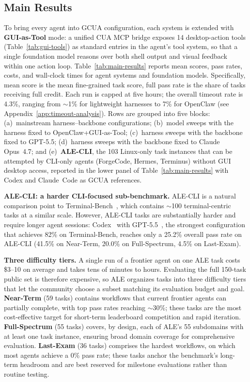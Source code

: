 \documentclass{llmxive}
\providecommand{\taskcount}{55}
\providecommand{\neartermcount}{59}
\providecommand{\fullspectrumcount}{55}
\providecommand{\lastexamcount}{36}
\providecommand{\publictaskcount}{150}
\providecommand{\aleclicount}{103}
\begin{document}
\subsection{Main Results}
To bring every agent into GCUA configuration, each system is extended with \textbf{GUI-as-Tool} mode: a unified CUA MCP bridge exposes 14 desktop-action tools (Table~\ref{tab:gui-tools}) as standard entries in the agent's tool system, so that a single foundation model reasons over both shell output and visual feedback within one action loop.
Table~\ref{tab:main-results} reports mean scores, pass rates, costs, and wall-clock times for agent systems and foundation models. Specifically, mean score is the mean fine-grained task score, full pass rate is the share of tasks receiving full credit. Each run is capped at five hours; the overall timeout rate is 4.3\%, ranging from ${\sim}$1\% for lightweight harnesses to 7\% for OpenClaw (see Appendix~\ref{app:timeout-analysis}).
Rows are grouped into five blocks: (a)~mainstream harness--backbone configurations; (b)~model sweeps with the harness fixed to OpenClaw+GUI-as-Tool; (c)~harness sweeps with the backbone fixed to GPT-5.5; (d)~harness sweeps with the backbone fixed to Claude Opus~4.7; and (e)~\textbf{ALE-CLI}, the \aleclicount{} Linux-only task instances that can be attempted by CLI-only agents (ForgeCode, Hermes, Terminus) without GUI desktop access, reported in the lower panel of Table~\ref{tab:main-results} with Codex and Claude~Code as GCUA references.

\noindent \textbf{ALE-CLI: a harder CLI-focused sub-benchmark.}
ALE-CLI is a natural comparison point to Terminal-Bench~\citep{merrill2026terminalbench}, which contains ${\sim}$100 terminal-centric tasks at a similar scale.
However, ALE-CLI tasks are substantially harder and require longer agent sessions:
Codex~\citep{openai2025codex} with GPT-5.5~\citep{openai2026gpt55}, the strongest configuration that achieves 82\% on Terminal-Bench, reaches only a 25.2\% overall pass rate on ALE-CLI (41.5\% on Near-Term, 20.0\% on Full-Spectrum, 4.5\% on Last-Exam).

\noindent \textbf{Three difficulty tiers.}
A single run of a frontier agent on one ALE task costs \$3--10 on average and takes tens of minutes to hours.
Evaluating the full \publictaskcount{}-task public set is therefore expensive, so ALE organizes tasks into three difficulty tiers that let the community choose a subset matching its evaluation budget and goal.
\textbf{Near-Term} (\neartermcount{} tasks) contains workflows that current frontier agents can partially complete, with top pass rates reaching $\sim$30\%; these tasks are the most cost-effective target for short-term leaderboard competition and rapid iteration.
\textbf{Full-Spectrum} (\fullspectrumcount{} tasks) covers, by design, each of ALE's \taskcount{} subdomains with at least one task instance, ensuring broad domain coverage for comprehensive evaluation.
\textbf{Last-Exam} (\lastexamcount{} tasks) comprises the hardest workflows, on which most agents achieve a 0\% pass rate; these tasks anchor the benchmark's long-term headroom and are best reserved for milestone evaluations rather than routine testing.
\end{document}
